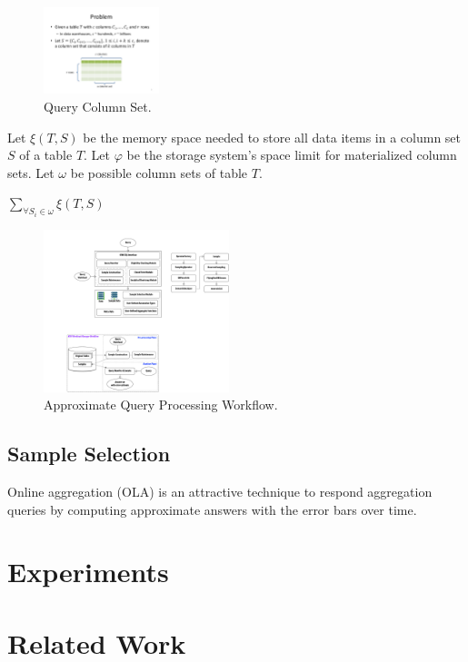 \documentclass{sig-alternate-05-2015}
\begin{document}
\begin{figure}[htb]
        \centering
        \includegraphics[width=0.3\textwidth]{columnset.pdf}
        \caption{Query Column Set.}
        \label{fig:qcs}
\end{figure}

Let $\xi(T, S)$ be the memory space needed to store all data items in a column set $S$ of a table $T$.
Let $\varphi$ be the storage system's space limit for materialized column sets.
Let $\omega$ be possible column sets of table $T$. 

$\sum_{\forall S_i \in \omega} \xi(T, S)$

\begin{figure}[htb]
        \centering
        \includegraphics[width=0.48\textwidth]{workflow.pdf}
        \caption{Approximate Query Processing Workflow.}
        \label{fig:workflow}
\end{figure}

\subsection{Sample Selection}
Online aggregation (OLA) is an attractive technique to respond aggregation queries by computing approximate answers with the error bars over time.
\section{Experiments}

\section{Related Work}
\end{document}
